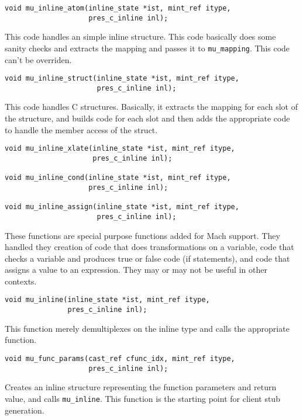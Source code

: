 \begin{verbatim}
void mu_inline_atom(inline_state *ist, mint_ref itype,
                    pres_c_inline inl);
\end{verbatim}

This code handles an simple inline structure.  This code basically does some
sanity checks and extracts the mapping and passes it to \texttt{mu\_mapping}.
This code can't be overriden.

\begin{verbatim}
void mu_inline_struct(inline_state *ist, mint_ref itype,
                      pres_c_inline inl);
\end{verbatim}

This code handles C structures.  Basically, it extracts the mapping for each
slot of the structure, and builds code for each slot and then adds the
appropriate code to handle the member access of the struct.

\begin{verbatim}
void mu_inline_xlate(inline_state *ist, mint_ref itype,
                     pres_c_inline inl);

void mu_inline_cond(inline_state *ist, mint_ref itype,
                    pres_c_inline inl);

void mu_inline_assign(inline_state *ist, mint_ref itype,
                      pres_c_inline inl);
\end{verbatim}

These functions are special purpose functions added for Mach support.  They
handled they creation of code that does transformations on a variable, code
that checks a variable and produces true or false code (if statements), and
code that assigns a value to an expression.  They may or may not be useful in
other contexts.

\begin{verbatim}
void mu_inline(inline_state *ist, mint_ref itype,
               pres_c_inline inl);
\end{verbatim}

This function merely demultiplexes on the inline type and calls the appropriate
function.

\begin{verbatim}
void mu_func_params(cast_ref cfunc_idx, mint_ref itype,
                    pres_c_inline inl);
\end{verbatim}

Creates an inline structure representing the function parameters and return
value, and calls \texttt{mu\_inline}.  This function is the starting point for
client stub generation.

